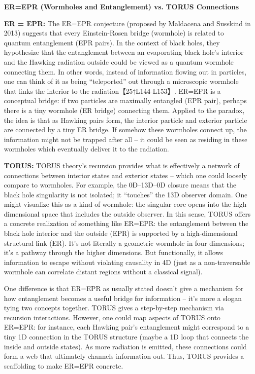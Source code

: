 \documentclass[]{article}
\begin{document}
\textbf{ER=EPR (Wormholes and Entanglement) vs. TORUS Connections}

\textbf{ER = EPR:} The ER=EPR conjecture (proposed by Maldacena and
Susskind in 2013) suggests that every Einstein-Rosen bridge (wormhole)
is related to quantum entanglement (EPR pairs). In the context of black
holes, they hypothesize that the entanglement between an evaporating
black hole's interior and the Hawking radiation outside could be viewed
as a quantum wormhole connecting them. In other words, instead of
information flowing out in particles, one can think of it as being
``teleported'' out through a microscopic wormhole that links the
interior to the radiation【25†L144-L153】. ER=EPR is a conceptual
bridge: if two particles are maximally entangled (EPR pair), perhaps
there is a tiny wormhole (ER bridge) connecting them. Applied to the
paradox, the idea is that as Hawking pairs form, the interior particle
and exterior particle are connected by a tiny ER bridge. If somehow
these wormholes connect up, the information might not be trapped after
all -- it could be seen as residing in these wormholes which eventually
deliver it to the radiation.

\textbf{TORUS:} TORUS theory's recursion provides what is effectively a
network of connections between interior states and exterior states --
which one could loosely compare to wormholes. For example, the
0D--13D--0D closure means that the black hole singularity is not
isolated; it ``touches'' the 13D observer domain. One might visualize
this as a kind of wormhole: the singular core opens into the
high-dimensional space that includes the outside observer. In this
sense, TORUS offers a concrete realization of something like ER=EPR: the
entanglement between the black hole interior and the outside (EPR) is
supported by a high-dimensional structural link (ER). It's not literally
a geometric wormhole in four dimensions; it's a pathway through the
higher dimensions. But functionally, it allows information to escape
without violating causality in 4D (just as a non-traversable wormhole
can correlate distant regions without a classical signal).

One difference is that ER=EPR as usually stated doesn't give a mechanism
for how entanglement becomes a useful bridge for information -- it's
more a slogan tying two concepts together. TORUS gives a step-by-step
mechanism via recursion interactions. However, one could map aspects of
TORUS onto ER=EPR: for instance, each Hawking pair's entanglement might
correspond to a tiny 1D connection in the TORUS structure (maybe a 1D
loop that connects the inside and outside states). As more radiation is
emitted, these connections could form a web that ultimately channels
information out. Thus, TORUS provides a scaffolding to make ER=EPR
concrete.
\end{document}
